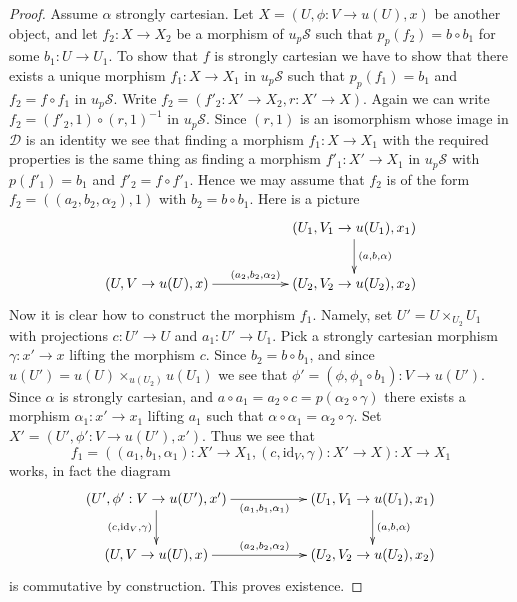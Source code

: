 \documentclass{stacks-project}
\theoremstyle{plain}
\theoremstyle{definition}
\theoremstyle{remark}
\numberwithin{equation}{subsection}
\begin{document}
\begin{proof}
\medskip\noindent
Assume $\alpha$ strongly cartesian.
Let $X = (U, \phi : V \to u(U), x)$ be another object, and let
$f_2 : X \to X_2$ be a morphism of $u_p\mathcal{S}$
such that $p_p(f_2) = b \circ b_1$ for some $b_1 : U \to U_1$.
To show that $f$ is strongly cartesian we have to show
that there exists a unique morphism $f_1 : X \to X_1$ in $u_p\mathcal{S}$
such that $p_p(f_1) = b_1$ and $f_2 = f \circ f_1$ in $u_p\mathcal{S}$.
Write $f_2 = (f'_2 : X' \to X_2, r : X' \to X)$. Again we can write
$f_2 = (f'_2, 1) \circ (r, 1)^{-1}$ in $u_p\mathcal{S}$. Since $(r, 1)$
is an isomorphism whose image in $\mathcal{D}$ is an identity we
see that finding a morphism $f_1 : X \to X_1$ with the required
properties is the same thing as finding a morphism $f'_1 : X' \to X_1$
in $u_p\mathcal{S}$ with $p(f'_1) = b_1$ and $f'_2 = f \circ f'_1$.
Hence we may assume that $f_2$ is of the form
$f_2 = ((a_2, b_2, \alpha_2), 1)$ with $b_2 = b \circ b_1$. Here is
a picture
$$
\xymatrix{
& & (U_1, V_1 \to u(U_1), x_1) \ar[d]^{(a, b, \alpha)} \\
(U, V \to u(U), x) \ar[rr]^{(a_2, b_2, \alpha_2)} & &
(U_2, V_2 \to u(U_2), x_2)
}
$$
Now it is clear how to construct the morphism $f_1$.
Namely, set $U' = U \times_{U_2} U_1$ with projections
$c : U' \to U$ and $a_1 : U' \to U_1$.
Pick a strongly cartesian morphism $\gamma : x' \to x$
lifting the morphism $c$. Since $b_2 = b \circ b_1$,
and since $u(U') = u(U) \times_{u(U_2)} u(U_1)$ we see that
$\phi' = (\phi, \phi_1 \circ b_1) : V \to u(U')$. Since
$\alpha$ is strongly cartesian, and
$a \circ a_1 = a_2 \circ c = p(\alpha_2 \circ \gamma)$
there exists a morphism
$\alpha_1 : x' \to x_1$ lifting $a_1$ such that
$\alpha \circ \alpha_1 = \alpha_2 \circ \gamma$.
Set $X' = (U', \phi' : V \to u(U'), x')$.
Thus we see that
$$
f_1 =
((a_1, b_1, \alpha_1) : X' \to X_1, (c, \text{id}_V, \gamma) : X' \to X) :
X \longrightarrow X_1
$$
works, in fact the diagram
$$
\xymatrix{
(U', \phi' : V \to u(U'), x')
\ar[d]_{(c, \text{id}_V, \gamma)}
\ar[rr]_{(a_1, b_1, \alpha_1)}
& & (U_1, V_1 \to u(U_1), x_1) \ar[d]^{(a, b, \alpha)} \\
(U, V \to u(U), x) \ar[rr]^{(a_2, b_2, \alpha_2)} & &
(U_2, V_2 \to u(U_2), x_2)
}
$$
is commutative by construction. This proves existence.


\end{proof}
\end{document}
